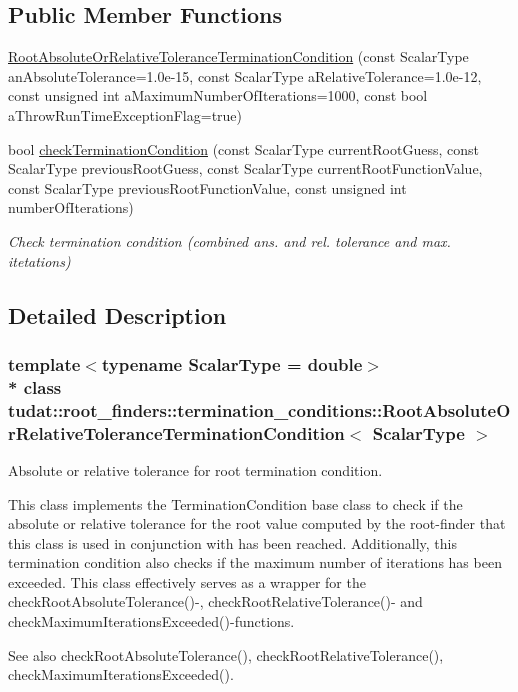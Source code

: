 \subsection*{Public Member Functions}
\begin{DoxyCompactItemize}
\item 
\hyperlink{classtudat_1_1root__finders_1_1termination__conditions_1_1RootAbsoluteOrRelativeToleranceTerminationCondition_a15f19696bbc8d338ae48afe4f9e50294}{Root\+Absolute\+Or\+Relative\+Tolerance\+Termination\+Condition} (const Scalar\+Type an\+Absolute\+Tolerance=1.\+0e-\/15, const Scalar\+Type a\+Relative\+Tolerance=1.\+0e-\/12, const unsigned int a\+Maximum\+Number\+Of\+Iterations=1000, const bool a\+Throw\+Run\+Time\+Exception\+Flag=true)
\item 
bool \hyperlink{classtudat_1_1root__finders_1_1termination__conditions_1_1RootAbsoluteOrRelativeToleranceTerminationCondition_ab2ee1708730c00d2991fd8b9264313de}{check\+Termination\+Condition} (const Scalar\+Type current\+Root\+Guess, const Scalar\+Type previous\+Root\+Guess, const Scalar\+Type current\+Root\+Function\+Value, const Scalar\+Type previous\+Root\+Function\+Value, const unsigned int number\+Of\+Iterations)
\begin{DoxyCompactList}\small\item\em Check termination condition (combined ans. and rel. tolerance and max. itetations) \end{DoxyCompactList}\end{DoxyCompactItemize}


\subsection{Detailed Description}
\subsubsection*{template$<$typename Scalar\+Type = double$>$\\*
class tudat\+::root\+\_\+finders\+::termination\+\_\+conditions\+::\+Root\+Absolute\+Or\+Relative\+Tolerance\+Termination\+Condition$<$ Scalar\+Type $>$}

Absolute or relative tolerance for root termination condition. 

This class implements the Termination\+Condition base class to check if the absolute or relative tolerance for the root value computed by the root-\/finder that this class is used in conjunction with has been reached. Additionally, this termination condition also checks if the maximum number of iterations has been exceeded. This class effectively serves as a wrapper for the check\+Root\+Absolute\+Tolerance()-\/, check\+Root\+Relative\+Tolerance()-\/ and check\+Maximum\+Iterations\+Exceeded()-\/functions. \begin{DoxySeeAlso}{See also}
check\+Root\+Absolute\+Tolerance(), check\+Root\+Relative\+Tolerance(), check\+Maximum\+Iterations\+Exceeded(). 
\end{DoxySeeAlso}


